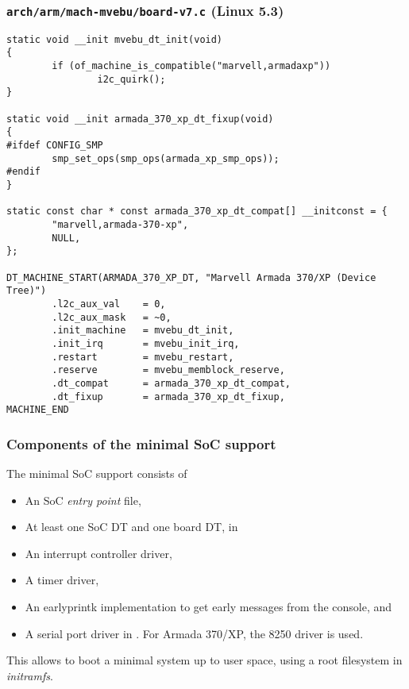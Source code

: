 \begin{frame}[fragile]
  \frametitle{{\tt arch/arm/mach-mvebu/board-v7.c} (Linux 5.3)}
  \begin{block}{}
    \begin{verbatim}
static void __init mvebu_dt_init(void)
{
        if (of_machine_is_compatible("marvell,armadaxp"))
                i2c_quirk();
}

static void __init armada_370_xp_dt_fixup(void)
{
#ifdef CONFIG_SMP
        smp_set_ops(smp_ops(armada_xp_smp_ops));
#endif
}

static const char * const armada_370_xp_dt_compat[] __initconst = {
        "marvell,armada-370-xp",
        NULL,
};

DT_MACHINE_START(ARMADA_370_XP_DT, "Marvell Armada 370/XP (Device Tree)")
        .l2c_aux_val    = 0,
        .l2c_aux_mask   = ~0,
        .init_machine   = mvebu_dt_init,
        .init_irq       = mvebu_init_irq,
        .restart        = mvebu_restart,
        .reserve        = mvebu_memblock_reserve,
        .dt_compat      = armada_370_xp_dt_compat,
        .dt_fixup       = armada_370_xp_dt_fixup,
MACHINE_END
  \end{verbatim}
 \end{block}
\end{frame}

\begin{frame}
  \frametitle{Components of the minimal SoC support}
  The minimal SoC support consists of
  \footnotesize
  \begin{itemize}
  \item An SoC {\em entry point} file,
  \item At least one SoC  DT and one board  DT,
    in 
  \item An interrupt controller driver,
  \item A timer driver,
  \item An earlyprintk implementation to get early messages from the
    console,  and
  \item A serial port driver in . For Armada
    370/XP, the 8250 driver  is used.
  \end{itemize}
  \normalsize
  This allows to boot a minimal system up to user space, using a root
  filesystem in {\em initramfs}.
\end{frame}

